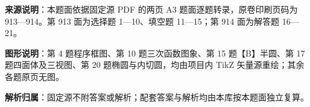 

\begin{gknotice}
\textbf{来源说明}：本题面依据固定源 PDF 的两页 A3 题面逐题转录，原卷印刷页码为 913—914。第 913 面为选择题 1—10、填空题 11—15；第 914 面为解答题 16—21。

\textbf{图形说明}：第 4 题程序框图、第 10 题三次函数图象、第 15 题【B】半圆、第 17 题四面体及三视图、第 20 题椭圆与内切圆，均由项目内 TikZ 矢量源重绘；其余各题原页无图。

\textbf{解析归属}：固定源不附答案或解析；配套答案与解析均由本库按本题面独立复算。
\end{gknotice}


